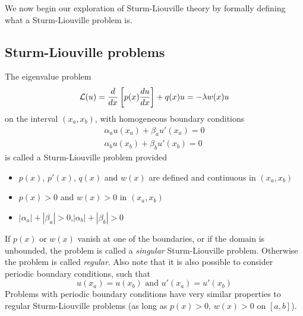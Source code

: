 We now begin our exploration of Sturm-Liouville theory by formally defining what a Sturm-Liouville problem is.

\subsection{Sturm-Liouville problems} 

The eigenvalue problem 
\begin{equation}
     {\cal L}(u) = \frac{d}{dx} \left[ p(x) \frac{du}{dx}\right] + q(x) u  = - \lambda w(x)  u   
\end{equation}
on the interval $(x_a,x_b)$, with homogeneous boundary conditions
\begin{eqnarray}
\alpha_a u(x_a) + \beta_a u'(x_a) = 0 \\
\alpha_b u(x_b) + \beta_b u'(x_b) = 0
\end{eqnarray}
is called a Sturm-Liouville problem provided 
\begin{itemize}
    \item $p(x)$, $p'(x)$, $q(x)$ and $w(x)$ are defined and continuous in $(x_a,x_b)$
    \item $p(x)>0$ and $w(x)>0$ in $(x_a,x_b)$
    \item $|\alpha_a| + |\beta_a| > 0$,$|\alpha_b| + |\beta_b| > 0$  
\end{itemize}

If $p(x)$ or $w(x)$ vanish at one of the boundaries, or if the domain is unbounded, the problem is called a {\it singular} Sturm-Liouville problem. Otherwise the problem is called {\it regular}. Also note that it is also possible to consider periodic boundary conditions, such that 
\begin{equation}
    u(x_a) = u(x_b) \mbox{  
 and }  u'(x_a) = u'(x_b)
\end{equation}
Problems with periodic boundary conditions have very similar properties to regular Sturm-Liouville problems (as long as $p(x) > 0$, $w(x) > 0 $ on $[a,b]$).

